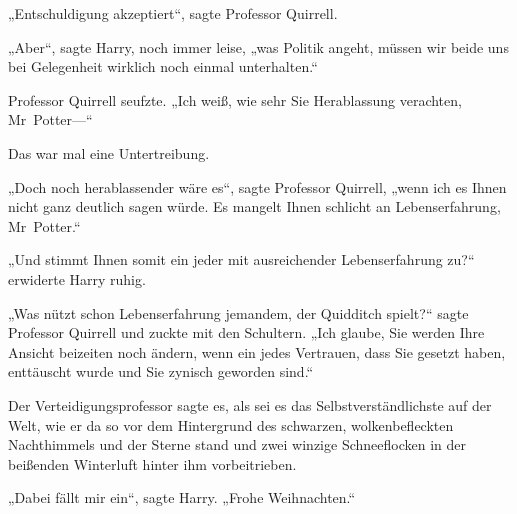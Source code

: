 „Entschuldigung akzeptiert“, sagte Professor Quirrell.

„Aber“, sagte Harry, noch immer leise, „was Politik angeht, müssen wir beide uns bei Gelegenheit wirklich noch einmal unterhalten.“


Professor Quirrell seufzte. „Ich weiß, wie sehr Sie Herablassung verachten, Mr~Potter—“

Das war mal eine Untertreibung.

„Doch noch herablassender wäre es“, sagte Professor Quirrell, „wenn ich es Ihnen nicht ganz deutlich sagen würde. Es mangelt Ihnen schlicht an Lebenserfahrung, Mr~Potter.“

„Und stimmt Ihnen somit ein jeder mit ausreichender Lebenserfahrung zu?“ erwiderte Harry ruhig.

„Was nützt schon Lebenserfahrung jemandem, der Quidditch spielt?“ sagte Professor Quirrell und zuckte mit den Schultern. „Ich glaube, Sie werden Ihre Ansicht beizeiten noch ändern, wenn ein jedes Vertrauen, dass Sie gesetzt haben, enttäuscht wurde und Sie zynisch geworden sind.“

Der Verteidigungsprofessor sagte es, als sei es das Selbstverständlichste auf der Welt, wie er da so vor dem Hintergrund des schwarzen, wolkenbefleckten Nachthimmels und der Sterne stand und zwei winzige Schneeflocken in der beißenden Winterluft hinter ihm vorbeitrieben.

„Dabei fällt mir ein“, sagte Harry. „Frohe Weihnachten.“

